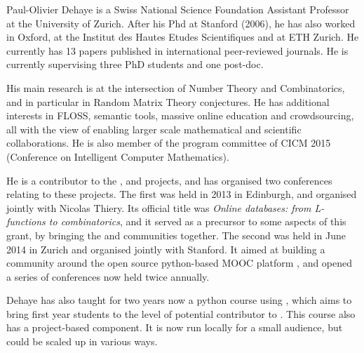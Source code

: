 \begin{participant}[type=leadPI,PM=13,gender=male]{Paul-Olivier Dehaye}
  is a Swiss National Science Foundation Assistant Professor at the
  University of Zurich. After his Phd at Stanford (2006), he has also worked in Oxford, at
  the Institut des Hautes Etudes Scientifiques and at ETH Zurich. He currently has 13
  papers published in international peer-reviewed journals. He is currently supervising
  three PhD students and one post-doc.

  His main research is at the intersection of Number Theory and Combinatorics, and in
  particular in Random Matrix Theory conjectures. He has additional interests in FLOSS,
  semantic tools, massive online education and crowdsourcing, all with the view of
  enabling larger scale mathematical and scientific collaborations. He is also member of
  the program committee of CICM 2015 (Conference on Intelligent Computer Mathematics).

  He is a contributor to the \Sage, \LMFDB and \OpenEdX projects, and has organised two
  conferences relating to these projects. The first was held in 2013 in Edinburgh, and
  organised jointly with Nicolas Thiery. Its official title was \emph{Online databases:
    from L-functions to combinatorics}, and it served as a precursor to some aspects of
  this grant, by bringing the \SageCombinat and \LMFDB communities together.  The second
  was held in June 2014 in Zurich and organised jointly with Stanford. It aimed at
  building a community around the open source python-based MOOC platform \OpenEdX, and
  opened a series of conferences now held twice annually.

  Dehaye has also taught for two years now a python course using \OpenEdX, which aims to
  bring first year students to the level of potential contributor to \Sage. This course
  also has a project-based component. It is now run locally for a small audience, but
  could be scaled up in various ways.
\end{participant}


